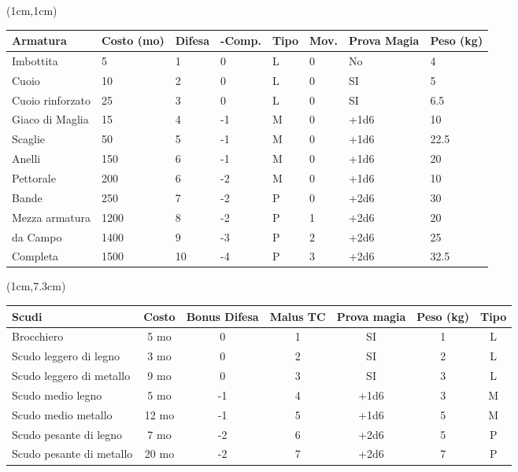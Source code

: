 \documentclass[a4paper,12 pt,openany]{book}
\begin{document}
	\begin{textblock*}{19cm}(1cm,1cm) %

	\begin{tabular}{llllllll}
		\textbf{Armatura} & \textbf{Costo (mo)} & \textbf{Difesa} & \textbf{-Comp.} &  \textbf{Tipo} & \textbf{Mov.} & \textbf{Prova Magia}&\textbf{Peso (kg)}\\
\hline
		Imbottita   & 5    & 1   & 0  &  L   & 0   & No&4\\
		Cuoio   & 10   & 2   & 0   & L   & 0   & SI&5\\
		Cuoio rinforzato   & 25  &3  & 0   &    L   & 0 &SI  & 6.5\\
		Giaco di Maglia   & 15   & 4  & -1  &  M   & 0  &+1d6 & 10\\
		Scaglie& 50   & 5  & -1  &  M   & 0 &+1d6  & 22.5\\
		Anelli & 150  & 6  & -1  &  M   & 0  &+1d6 & 20\\
		Pettorale    & 200  & 6  & -2  &  M  &  0 &+1d6  & 10\\
		Bande   & 250  & 7  & -2  &  P   & 0  &+2d6 & 30\\
		Mezza armatura   & 1200 & 8  & -2  &  P   & 1 &+2d6  & 20\\
		da Campo& 1400 & 9 & -3  &   P   & 2  &+2d6 & 25\\
		Completa& 1500 & 10  & -4  & P   & 3  &+2d6 & 32.5\\
	\end{tabular}
\end{textblock*}

		\begin{textblock*}{19cm}(1cm,7.3cm) %
\begin{tabular}{lcccccc}
	\textbf{Scudi} & \textbf{Costo} & \textbf{Bonus Difesa} & \textbf{Malus TC} & \textbf{Prova magia} & \textbf{Peso (kg)} & \textbf{Tipo}\\
\hline
	Brocchiero& 5 mo  &  0& 1& SI&1  & L\\
	Scudo leggero di legno   & 3 mo  &  0& 2& SI&2  & L\\
	Scudo leggero di metallo & 9  mo  &  0& 3&SI& 3  & L\\
	Scudo medio legno   & 5 mo   &  -1& 4& +1d6&3  & M\\
	Scudo medio metallo & 12 mo  & -1  & 5& +1d6&5  & M\\
	Scudo pesante di legno   & 7  mo  &  -2    & 6& +2d6&5  & P\\
	Scudo pesante di metallo & 20 mo  &  -2    & 7& +2d6&7  & P\\
\end{tabular}
\end{textblock*}
\end{document}
